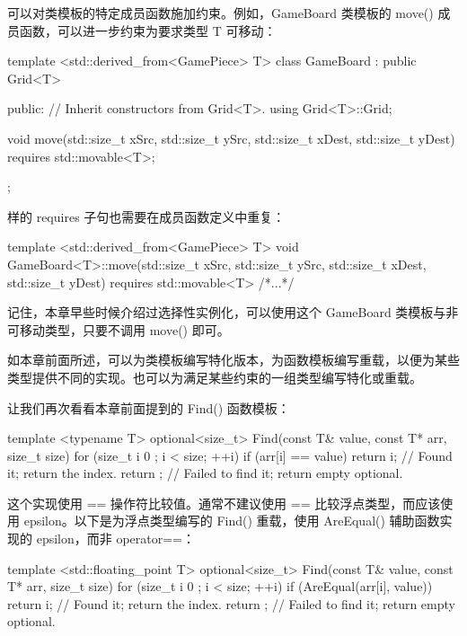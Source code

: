 
可以对类模板的特定成员函数施加约束。例如，GameBoard 类模板的 move() 成员函数，可以进一步约束为要求类型 T 可移动：

\begin{cpp}
template <std::derived_from<GamePiece> T>
class GameBoard : public Grid<T>
{
    public:
        // Inherit constructors from Grid<T>.
        using Grid<T>::Grid;

        void move(std::size_t xSrc, std::size_t ySrc,
            std::size_t xDest, std::size_t yDest) requires std::movable<T>;
};
\end{cpp}

样的 requires 子句也需要在成员函数定义中重复：

\begin{cpp}
template <std::derived_from<GamePiece> T>
void GameBoard<T>::move(std::size_t xSrc, std::size_t ySrc,
    std::size_t xDest, std::size_t yDest) requires std::movable<T>
{ /*...*/ }
\end{cpp}

记住，本章早些时候介绍过选择性实例化，可以使用这个 GameBoard 类模板与非可移动类型，只要不调用 move() 即可。


如本章前面所述，可以为类模板编写特化版本，为函数模板编写重载，以便为某些类型提供不同的实现。也可以为满足某些约束的一组类型编写特化或重载。

让我们再次看看本章前面提到的 Find() 函数模板：

\begin{cpp}
template <typename T>
optional<size_t> Find(const T& value, const T* arr, size_t size)
{
    for (size_t i { 0 }; i < size; ++i) {
        if (arr[i] == value) {
            return i; // Found it; return the index.
            }
        }
    return {}; // Failed to find it; return empty optional.
}
\end{cpp}

这个实现使用 == 操作符比较值。通常不建议使用 == 比较浮点类型，而应该使用 epsilon。以下是为浮点类型编写的 Find() 重载，使用 AreEqual() 辅助函数实现的 epsilon，而非 operator==：

\begin{cpp}
template <std::floating_point T>
optional<size_t> Find(const T& value, const T* arr, size_t size)
{
    for (size_t i { 0 }; i < size; ++i) {
        if (AreEqual(arr[i], value)) {
            return i; // Found it; return the index.
        }
    }
    return {}; // Failed to find it; return empty optional.
}
\end{cpp}

